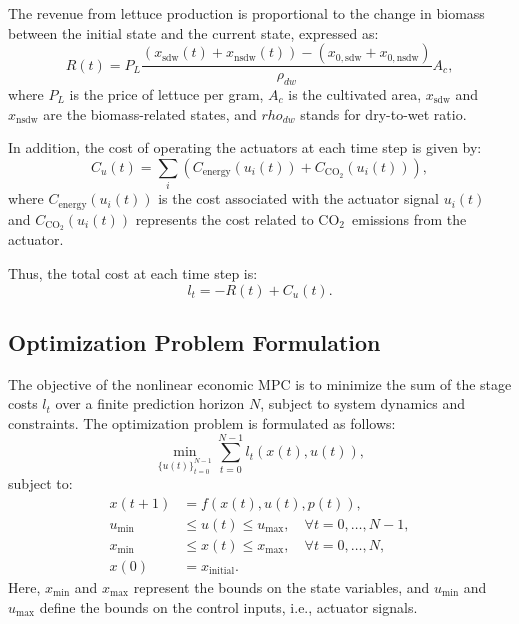 \documentclass[conference]{IEEEtran}
\newcommand{\ui}[2]{#1_{\mathrm{#2}}}
\newcommand{\coo}{\ensuremath{\mathrm{CO_2}}}
\begin{document}
The revenue from lettuce production is proportional to the change in biomass between the initial state and the current state, expressed as:
\begin{equation}
    R(t) = P_L  \frac{(\ui{x}{sdw}(t) + x_{\mathrm{nsdw}}(t)) - (x_{0, \mathrm{sdw}} + x_{0, \mathrm{nsdw} })}{\rho_{dw}}  A_c,
\end{equation}
where \(P_L\) is the price of lettuce per gram, \(A_c\) is the cultivated area, \(\ui{x}{sdw}\) and \(x_{\mathrm{nsdw}}\) are the biomass-related states, and \(rho_{dw}\) stands for dry-to-wet ratio.

In addition, the cost of operating the actuators at each time step is given by:
\begin{equation}
    C_u(t) = \sum_{i} \left( C_{\text{energy}}(u_i(t)) + C_{\coo}(u_i(t)) \right),
\end{equation}
where \(C_{\text{energy}}(u_i(t))\) is the cost associated with the actuator signal \(u_i(t)\) and \(C_{\coo}(u_i(t))\) represents the cost related to \coo\ emissions from the actuator.

Thus, the total cost at each time step is:
\begin{equation}
    l_t = -R(t) + C_u(t).
\end{equation}

\subsection{Optimization Problem Formulation}

The objective of the nonlinear economic MPC is to minimize the sum of the stage costs \(l_t\) over a finite prediction horizon \(N\), subject to system dynamics and constraints. The optimization problem is formulated as follows:
\begin{equation}
    \min_{{\{u(t)\}}_{t=0}^{N-1}} \sum_{t=0}^{N-1} l_t(x(t), u(t)),
\end{equation}
subject to:
\begin{align}
    x(t+1)   & = f(x(t), u(t), p(t)),                                    \\
    u_{\min} & \leq u(t) \leq u_{\max}, \quad \forall t = 0, \dots, N-1, \\
    x_{\min} & \leq x(t) \leq x_{\max}, \quad \forall t = 0, \dots, N,   \\
    x(0)     & = x_{\text{initial}}.
\end{align}
Here, \(x_{\min}\) and \(x_{\max}\) represent the bounds on the state variables, and \(u_{\min}\) and \(u_{\max}\) define the bounds on the control inputs, i.e., actuator signals.
\end{document}
